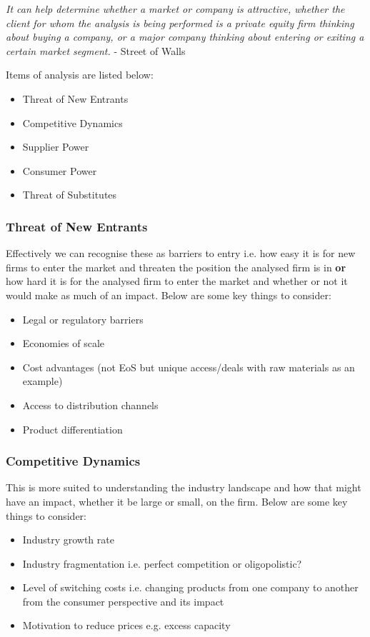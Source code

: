 \documentclass[a4paper]{article}
\begin{document}
{\vspace{5pt}
\noindent \textit{It can help determine whether a market or company is attractive, whether the client for whom the analysis is being performed is a private equity firm thinking about buying a company, or a major company thinking about entering or exiting a certain market segment.} - Street of Walls

\vspace{5pt}
\noindent Items of analysis are listed below:
\begin{itemize}
	\item Threat of New Entrants
	\item Competitive Dynamics
	\item Supplier Power
	\item Consumer Power
	\item Threat of Substitutes
\end{itemize}

\subsubsection{Threat of New Entrants}
Effectively we can recognise these as barriers to entry i.e. how easy it is for new firms to enter the market and threaten the position the analysed firm is in \textbf{or} how hard it is for the analysed firm to enter the market and whether or not it would make as much of an impact. Below are some key things to consider:

\begin{itemize}
	\item Legal or regulatory barriers
	\item Economies of scale
	\item Cost advantages (not EoS but unique access/deals with raw materials as an example)
	\item Access to distribution channels
	\item Product differentiation
\end{itemize}

\subsubsection{Competitive Dynamics}
This is more suited to understanding the industry landscape and how that might have an impact, whether it be large or small, on the firm. Below are some key things to consider:

\begin{itemize}
	\item Industry growth rate
	\item Industry fragmentation i.e. perfect competition or oligopolistic?
	\item Level of switching costs i.e. changing products from one company to another from the consumer perspective and its impact
	\item Motivation to reduce prices e.g. excess capacity
\end{itemize}

}
\end{document}
